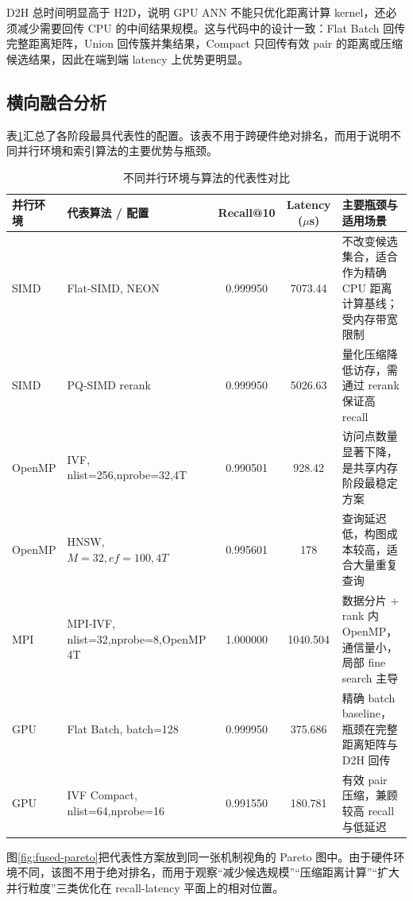\documentclass[a4paper]{article}
\begin{document}
D2H 总时间明显高于 H2D，说明 GPU ANN 不能只优化距离计算 kernel，还必须减少需要回传 CPU 的中间结果规模。这与代码中的设计一致：Flat Batch 回传完整距离矩阵，Union 回传簇并集结果，Compact 只回传有效 pair 的距离或压缩候选结果，因此在端到端 latency 上优势更明显。

\subsection{横向融合分析}

表\ref{tab:global-main}汇总了各阶段最具代表性的配置。该表不用于跨硬件绝对排名，而用于说明不同并行环境和索引算法的主要优势与瓶颈。

\begin{table}[H]
\centering
\scriptsize
\caption{不同并行环境与算法的代表性对比}
\label{tab:global-main}
\begin{tabularx}{\textwidth}{llccX}
\toprule
并行环境 & 代表算法 / 配置 & Recall@10 & Latency ($\mu$s) & 主要瓶颈与适用场景 \\
\midrule
SIMD & Flat-SIMD, NEON & 0.999950 & 7073.44 & 不改变候选集合，适合作为精确 CPU 距离计算基线；受内存带宽限制 \\
SIMD & PQ-SIMD rerank & 0.999950 & 5026.63 & 量化压缩降低访存，需通过 rerank 保证高 recall \\
OpenMP & IVF, nlist=256,nprobe=32,4T & 0.990501 & 928.42 & 访问点数量显著下降，是共享内存阶段最稳定方案 \\
OpenMP & HNSW, $M=32,ef=100,4T$ & 0.995601 & 178 & 查询延迟低，构图成本较高，适合大量重复查询 \\
MPI & MPI-IVF, nlist=32,nprobe=8,OpenMP 4T & 1.000000 & 1040.504 & 数据分片 + rank 内 OpenMP，通信量小，局部 fine search 主导 \\
GPU & Flat Batch, batch=128 & 0.999950 & 375.686 & 精确 batch baseline，瓶颈在完整距离矩阵与 D2H 回传 \\
GPU & IVF Compact, nlist=64,nprobe=16 & 0.991550 & 180.781 & 有效 pair 压缩，兼顾较高 recall 与低延迟 \\
\bottomrule
\end{tabularx}
\end{table}

图\ref{fig:fused-pareto}把代表性方案放到同一张机制视角的 Pareto 图中。由于硬件环境不同，该图不用于绝对排名，而用于观察“减少候选规模”“压缩距离计算”“扩大并行粒度”三类优化在 recall-latency 平面上的相对位置。
\end{document}
